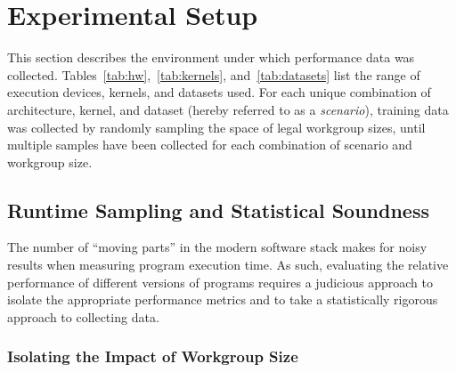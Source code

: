 \section{Experimental Setup}

This section describes the environment under which performance data
was collected. Tables~\ref{tab:hw},~\ref{tab:kernels},
and~\ref{tab:datasets} list the range of execution devices, kernels,
and datasets used. For each unique combination of architecture,
kernel, and dataset (hereby referred to as a \emph{scenario}),
training data was collected by randomly sampling the space of legal
workgroup sizes, until multiple samples have been collected for each
combination of scenario and workgroup size.


\begin{table}

\caption{%
  Execution devices. %
}
\label{tab:hw}
\end{table}

\begin{table}

\caption{%
  Benchmark applications, border sizes, and static instruction counts.
  The ``simple'' and ``complex'' kernels are synthetic training
  programs. %
}
\label{tab:kernels}
\end{table}

\begin{table}

\caption{%
  Datasets used.%
}
\label{tab:datasets}
\end{table}


\subsection{Runtime Sampling and Statistical Soundness}

The number of ``moving parts'' in the modern software stack makes for
noisy results when measuring program execution time. As such,
evaluating the relative performance of different versions of programs
requires a judicious approach to isolate the appropriate performance
metrics and to take a statistically rigorous approach to collecting
data.


\subsubsection{Isolating the Impact of Workgroup Size}

